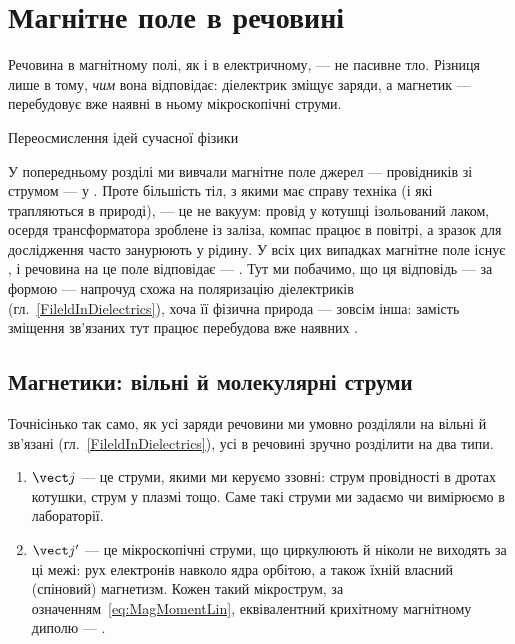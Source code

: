 \providecommand{\Mfield}{\vect{M}}

\chapter{Магнітне поле в речовині}\label{\currfilebase}
\graphicspath{{\currfilebase/Pictures}}
\epigraph{Речовина в магнітному полі, як і в електричному, --- не пасивне тло. Різниця лише в тому, \emph{чим} вона відповідає: діелектрик
	зміщує заряди, а магнетик --- перебудовує вже наявні в ньому мікроскопічні струми.
}{Переосмислення ідей сучасної фізики}

У попередньому розділі ми вивчали магнітне поле джерел --- провідників зі струмом --- у . Проте більшість тіл, з якими має справу
техніка (і які трапляються в природі), --- це не вакуум: провід у котушці ізольований лаком, осердя трансформатора зроблене із заліза, компас
працює в повітрі, а зразок для дослідження часто занурюють у рідину. У всіх цих випадках магнітне поле існує , і
речовина на це поле відповідає --- . Тут ми побачимо, що ця відповідь --- за формою --- напрочуд схожа на поляризацію
діелектриків (гл.~\ref{FileldInDielectrics}), хоча її фізична природа --- зовсім інша: замість зміщення зв'язаних  тут працює
перебудова вже наявних .

\section{Магнетики: вільні й молекулярні струми}

Точнісінько так само, як усі заряди речовини ми умовно розділяли на вільні й зв'язані (гл.~\ref{FileldInDielectrics}), усі  в
речовині зручно розділити на два типи.

\begin{enumerate}
	\item {} $\vect j$ --- це струми, якими ми керуємо ззовні: струм провідності в дротах котушки, струм у
	      плазмі тощо. Саме такі струми ми задаємо чи вимірюємо в лабораторії.
	\item {} $\vect j'$ --- це мікроскопічні струми, що циркулюють  й ніколи не виходять за ці межі: рух електронів навколо ядра орбітою, а також їхній власний (спіновий) магнетизм. Кожен такий
	      мікрострум, за означенням~\eqref{eq:MagMomentLin}, еквівалентний крихітному магнітному диполю --- .
\end{enumerate}

